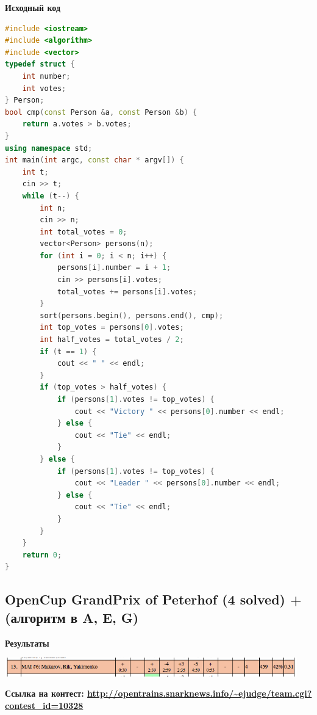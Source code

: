 \documentclass[a4paper,12pt]{article}
\begin{document}
\newpage
\textbf{{\large Исходный код}} \\
\begin{lstlisting}[language=C++]
#include <iostream>
#include <algorithm>
#include <vector>
typedef struct {
    int number;
    int votes;
} Person;
bool cmp(const Person &a, const Person &b) {
    return a.votes > b.votes;
}
using namespace std;
int main(int argc, const char * argv[]) {
    int t;
    cin >> t; 
    while (t--) {
        int n;
        cin >> n;
        int total_votes = 0;
        vector<Person> persons(n);
        for (int i = 0; i < n; i++) {
            persons[i].number = i + 1;
            cin >> persons[i].votes;
            total_votes += persons[i].votes;
        }
        sort(persons.begin(), persons.end(), cmp);
        int top_votes = persons[0].votes;
        int half_votes = total_votes / 2;
        if (t == 1) {
            cout << " " << endl;
        }
        if (top_votes > half_votes) {
            if (persons[1].votes != top_votes) {
                cout << "Victory " << persons[0].number << endl;
            } else {
                cout << "Tie" << endl;
            }
        } else {
            if (persons[1].votes != top_votes) {
                cout << "Leader " << persons[0].number << endl;
            } else {
                cout << "Tie" << endl;
            }
        }
    }
    return 0;
}
\end{lstlisting}






%
%
\newpage
\subsection{OpenCup GrandPrix of Peterhof (4 solved) + (алгоритм в A, E, G)}

\textbf{{\large Результаты}} \\
\begin{center}
\includegraphics[width=0.95\textwidth]{OC_Peterhof/result.png}\\ [1cm]
\end{center}

\textbf{{\large Ссылка на контест: \url{http://opentrains.snarknews.info/~ejudge/team.cgi?contest_id=10328}}}
\end{document}
